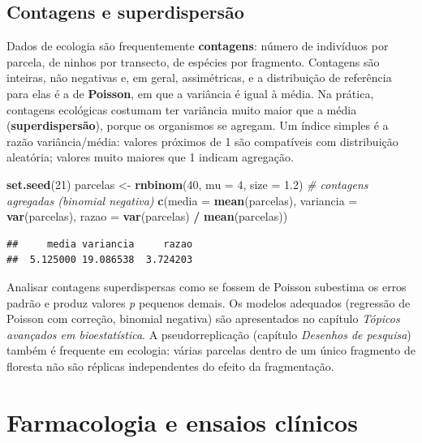\documentclass[
]{book}
\newenvironment{Shaded}{\begin{snugshade}}{\end{snugshade}}
\newcommand{\AttributeTok}[1]{\textcolor[rgb]{0.13,0.29,0.53}{#1}}
\newcommand{\CommentTok}[1]{\textcolor[rgb]{0.56,0.35,0.01}{\textit{#1}}}
\newcommand{\DecValTok}[1]{\textcolor[rgb]{0.00,0.00,0.81}{#1}}
\newcommand{\FloatTok}[1]{\textcolor[rgb]{0.00,0.00,0.81}{#1}}
\newcommand{\FunctionTok}[1]{\textcolor[rgb]{0.13,0.29,0.53}{\textbf{#1}}}
\newcommand{\NormalTok}[1]{#1}
\newcommand{\OtherTok}[1]{\textcolor[rgb]{0.56,0.35,0.01}{#1}}
\newcommand{\SpecialCharTok}[1]{\textcolor[rgb]{0.81,0.36,0.00}{\textbf{#1}}}
\begin{document}
\subsection{Contagens e superdispersão}\label{contagens-e-superdispersuxe3o}

Dados de ecologia são frequentemente \textbf{contagens}: número de indivíduos por parcela, de ninhos por transecto, de espécies por fragmento. Contagens são inteiras, não negativas e, em geral, assimétricas, e a distribuição de referência para elas é a de \textbf{Poisson}, em que a variância é igual à média. Na prática, contagens ecológicas costumam ter variância muito maior que a média (\textbf{superdispersão}), porque os organismos se agregam. Um índice simples é a razão variância/média: valores próximos de 1 são compatíveis com distribuição aleatória; valores muito maiores que 1 indicam agregação.

\begin{Shaded}
\begin{Highlighting}[]
\FunctionTok{set.seed}\NormalTok{(}\DecValTok{21}\NormalTok{)}
\NormalTok{parcelas }\OtherTok{\textless{}{-}} \FunctionTok{rnbinom}\NormalTok{(}\DecValTok{40}\NormalTok{, }\AttributeTok{mu =} \DecValTok{4}\NormalTok{, }\AttributeTok{size =} \FloatTok{1.2}\NormalTok{)   }\CommentTok{\# contagens agregadas (binomial negativa)}
\FunctionTok{c}\NormalTok{(}\AttributeTok{media =} \FunctionTok{mean}\NormalTok{(parcelas), }\AttributeTok{variancia =} \FunctionTok{var}\NormalTok{(parcelas), }\AttributeTok{razao =} \FunctionTok{var}\NormalTok{(parcelas) }\SpecialCharTok{/} \FunctionTok{mean}\NormalTok{(parcelas))}
\end{Highlighting}
\end{Shaded}

\begin{verbatim}
##     media variancia     razao 
##  5.125000 19.086538  3.724203
\end{verbatim}

Analisar contagens superdispersas como se fossem de Poisson subestima os erros padrão e produz valores \emph{p} pequenos demais. Os modelos adequados (regressão de Poisson com correção, binomial negativa) são apresentados no capítulo \emph{Tópicos avançados em bioestatística}. A pseudorreplicação (capítulo \emph{Desenhos de pesquisa}) também é frequente em ecologia: várias parcelas dentro de um único fragmento de floresta não são réplicas independentes do efeito da fragmentação.

\section{Farmacologia e ensaios clínicos}\label{farmacologia-e-ensaios-cluxednicos}
\end{document}
